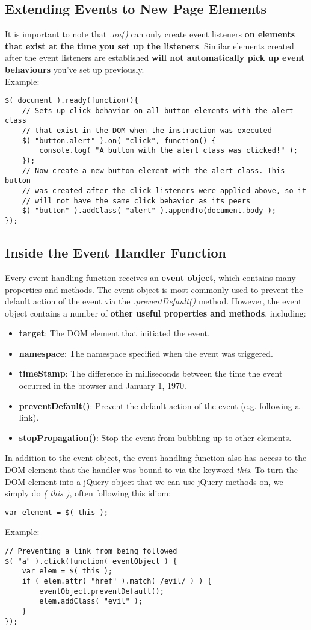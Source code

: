 \documentclass[10pt,letterpaper]{report}
\begin{document}
\subsection{Extending Events to New Page Elements}
It is important to note that \textit{.on()} can only create event listeners \textbf{on elements that exist at the time you set up the listeners}. Similar elements created after the event listeners are established \textbf{will not automatically pick up event behaviours} you've set up previously.\\
Example:
\begin{lstlisting}
$( document ).ready(function(){
	// Sets up click behavior on all button elements with the alert class
	// that exist in the DOM when the instruction was executed
	$( "button.alert" ).on( "click", function() {
		console.log( "A button with the alert class was clicked!" );
	});
	// Now create a new button element with the alert class. This button
	// was created after the click listeners were applied above, so it
	// will not have the same click behavior as its peers
	$( "button" ).addClass( "alert" ).appendTo(document.body );
});
\end{lstlisting}
\subsection{Inside the Event Handler Function}
Every event handling function receives an \textbf{event object}, which contains many properties and methods. The event object is most commonly used to prevent the default action of the event via the \textit{.preventDefault()} method. However, the event object contains a number of \textbf{other useful properties and methods}, including:
\begin{itemize}
\item \textbf{target}: The DOM element that initiated the event.
\item \textbf{namespace}: The namespace specified when the event was triggered.
\item \textbf{timeStamp}: The difference in milliseconds between the time the event occurred in the browser and January 1, 1970.
\item \textbf{preventDefault()}: Prevent the default action of the event (e.g. following a link).
\item \textbf{stopPropagation()}: Stop the event from bubbling up to other elements.
\end{itemize}
In addition to the event object, the event handling function also has access to the DOM element that the handler was bound to via the keyword \textit{this}. To turn the DOM element into a jQuery object that we can use jQuery methods on, we simply do \textit{\textdollar( this )}, often following this idiom:
\begin{lstlisting}
var element = $( this );
\end{lstlisting}
Example:
\begin{lstlisting}
// Preventing a link from being followed
$( "a" ).click(function( eventObject ) {
	var elem = $( this );
	if ( elem.attr( "href" ).match( /evil/ ) ) {
		eventObject.preventDefault();
		elem.addClass( "evil" );
	}
});
\end{lstlisting}
\end{document}
